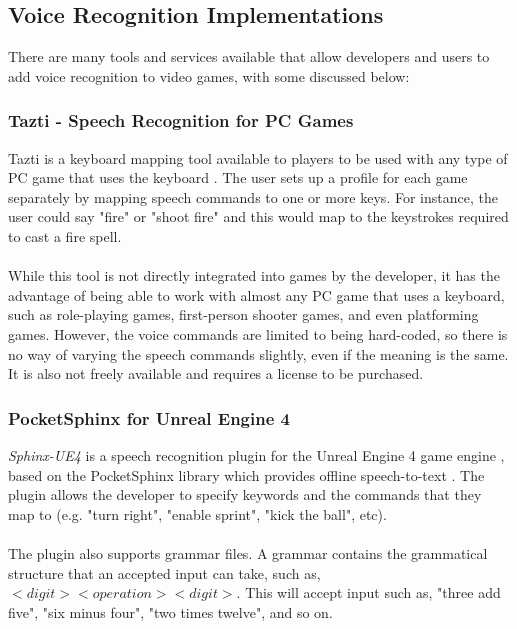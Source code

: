 \documentclass[12pt]{article}
\begin{document}
\subsection{Voice Recognition Implementations}

There are many tools and services available that allow developers and users to add voice recognition to video games, with some discussed below:

\subsubsection{Tazti - Speech Recognition for PC Games}

Tazti is a keyboard mapping tool available to players to be used with any type of PC game that uses the keyboard \cite{RefWorks:28}. The user sets up a profile for each game separately by mapping speech commands to one or more keys. For instance, the user could say "fire" or "shoot fire" and this would map to the keystrokes required to cast a fire spell.
\\
\\
While this tool is not directly integrated into games by the developer, it has the advantage of being able to work with almost any PC game that uses a keyboard, such as role-playing games, first-person shooter games, and even platforming games. However, the voice commands are limited to being hard-coded, so there is no way of varying the speech commands slightly, even if the meaning is the same. It is also not freely available and requires a license to be purchased.

\subsubsection{PocketSphinx for Unreal Engine 4}

\textit{Sphinx-UE4} is a speech recognition plugin for the Unreal Engine 4 game engine \cite{RefWorks:104}, based on the PocketSphinx library which provides offline speech-to-text \cite{RefWorks:105}. The plugin allows the developer to specify keywords and the commands that they map to (e.g. "turn right", "enable sprint", "kick the ball", etc).
\\
\\
The plugin also supports grammar files. A grammar contains the grammatical structure that an accepted input can take, such as, $<digit> <operation> <digit>$. This will accept input such as, "three add five", "six minus four", "two times twelve", and so on.
\end{document}

